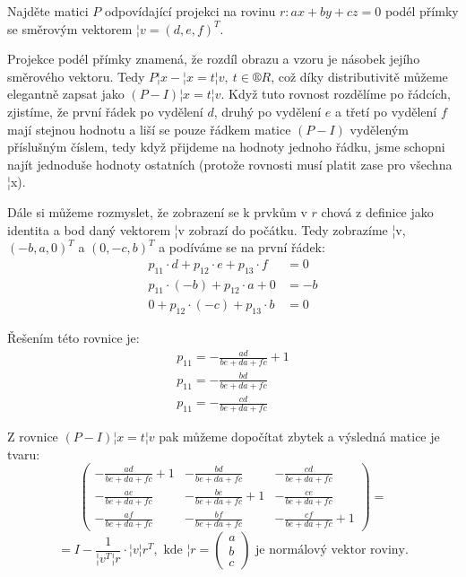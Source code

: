 \documentclass[12pt]{article}					%
\begin{document}
    \begin{priklad}[4.*]
        Najděte matici $P$ odpovídající projekci na rovinu $r: ax+by+cz = 0$ podél přímky se směrovým vektorem $¦v = (d, e, f)^T$.

        \begin{reseni}
            Projekce podél přímky znamená, že rozdíl obrazu a vzoru je násobek jejího směrového vektoru. Tedy $P¦x - ¦x = t¦v,\ t\in ®R$, což díky distributivitě můžeme elegantně zapsat jako $(P-I)¦x = t¦v$. Když tuto rovnost rozdělíme po řádcích, zjistíme, že první řádek po vydělení $d$, druhý po vydělení $e$ a třetí po vydělení $f$ mají stejnou hodnotu a liší se pouze řádkem matice $(P - I)$ vyděleným příslušným číslem, tedy když přijdeme na hodnoty jednoho řádku, jsme schopni najít jednoduše hodnoty ostatních (protože rovnosti musí platit zase pro všechna ¦x).

            Dále si můžeme rozmyslet, že zobrazení se k prvkům v $r$ chová z definice jako identita a bod daný vektorem ¦v zobrazí do počátku. Tedy zobrazíme ¦v, $(-b, a, 0)^T$ a $(0, -c, b)^T$ a podíváme se na první řádek:
            \begin{align*}
                p_{11}·d+p_{12}·e+p_{13}·f&=0\\
                p_{11}·(-b)+p_{12}·a+0&=-b\\
                0 +p_{12}·(-c)+p_{13}·b&=0
            \end{align*}

            Řešením této rovnice je:
            \begin{align*}
                p_{11} = -\frac{ad}{be+da+fc}+1\\
                p_{11} = -\frac{bd}{be+da+fc}\\
                p_{11} = -\frac{cd}{be+da+fc}
            \end{align*}

           Z rovnice $(P-I)¦x = t¦v$ pak můžeme dopočítat zbytek a výsledná matice je tvaru:
           $$ \begin{pmatrix} -\frac{ad}{be+da+fc}+1 & -\frac{bd}{be+da+fc} & -\frac{cd}{be+da+fc} \\ -\frac{ae}{be+da+fc} & -\frac{be}{be+da+fc}+1 & -\frac{ce}{be+da+fc} \\ -\frac{af}{be+da+fc} & -\frac{bf}{be+da+fc} & -\frac{cf}{be+da+fc} + 1 \end{pmatrix} = $$
           $$ = I - \frac{1}{¦v^T¦r}· ¦v¦r^T,\text{ kde } ¦r = \begin{pmatrix} a \\ b \\ c \end{pmatrix}\text{ je normálový vektor roviny}. $$ 
        \end{reseni}

    \end{priklad}
\end{document}
